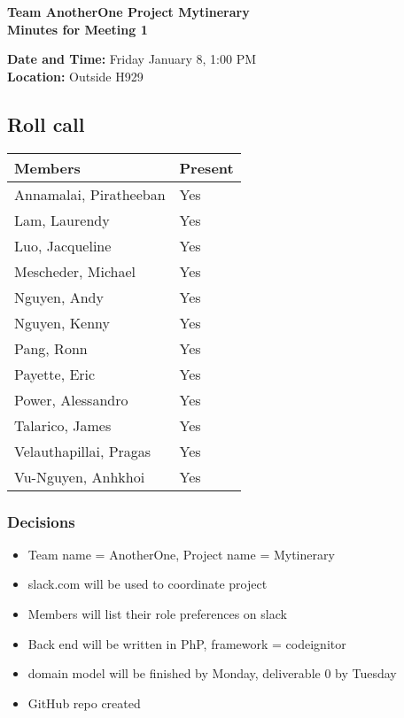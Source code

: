 \documentclass[paper=a4, fontsize=11pt]{scrartcl}
\begin{document}
\thispagestyle{empty}

\begin{center}
\textbf{Team AnotherOne \qquad Project Mytinerary \\ Minutes for Meeting 1}
\vspace{0.33cm}
\end{center}

\textbf{Date and Time: } Friday January 8, 1:00 PM \\
\textbf{Location: } Outside H929 \\

\subsection*{Roll call}

\begin{center}
\begin{tabular}{| m{4cm} | m{4cm} |} \hline
\textbf{Members} & \textbf{Present} \\ \hline
Annamalai, Piratheeban & Yes \\ \hline
Lam, Laurendy          & Yes \\ \hline
Luo, Jacqueline        & Yes \\ \hline
Mescheder, Michael     & Yes \\ \hline
Nguyen, Andy           & Yes \\ \hline
Nguyen, Kenny          & Yes \\ \hline
Pang, Ronn             & Yes \\ \hline
Payette, Eric          & Yes \\ \hline
Power, Alessandro      & Yes \\ \hline
Talarico, James        & Yes \\ \hline
Velauthapillai, Pragas & Yes \\ \hline
Vu-Nguyen, Anhkhoi     & Yes \\ \hline
\end{tabular}
\end{center}

\subsubsection*{Decisions}
\begin{itemize}
    \item Team name = AnotherOne, Project name = Mytinerary
    \item slack.com will be used to coordinate project
    \item Members will list their role preferences on slack
    \item Back end will be written in PhP, framework = codeignitor
    \item domain model will be finished by Monday, deliverable 0 by Tuesday
    \item GitHub repo created
\end{itemize}

\subsection*{\color{red}{Next Meeting: Friday January 15, 1:15 PM}}
\end{document}
